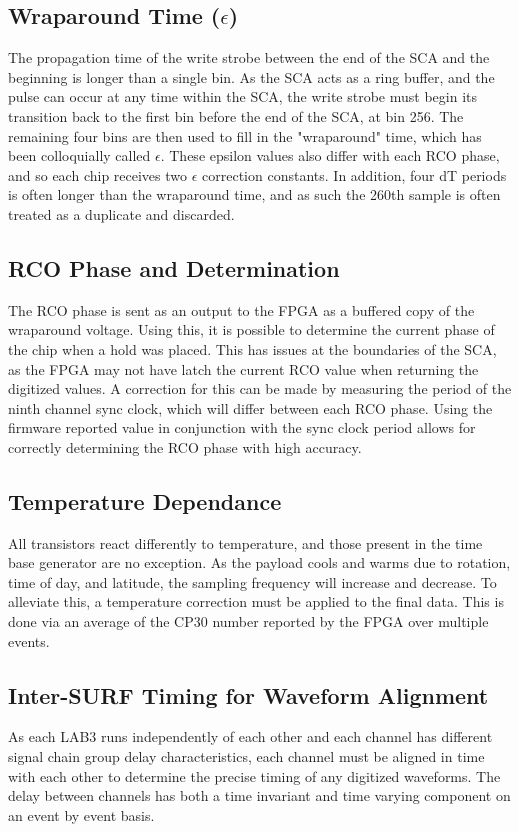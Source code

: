		
	\subsection{Wraparound Time ($\epsilon$)}
		The propagation time of the write strobe between the end of the SCA and the beginning is longer than a single bin.  As the SCA acts as a ring buffer, and the pulse can occur at any time within the SCA, the write strobe must begin its transition back to the first bin before the end of the SCA, at bin 256.  The remaining four bins are then used to fill in the "wraparound" time, which has been colloquially called $\epsilon$.  These epsilon values also differ with each RCO phase, and so each chip receives two $\epsilon$ correction constants. In addition, four dT periods is often longer than the wraparound time, and as such the 260th sample is often treated as a duplicate and discarded.  
		
	\subsection{RCO Phase and Determination}
		The RCO phase is sent as an output to the FPGA as a buffered copy of the wraparound voltage.  Using this, it is possible to determine the current phase of the chip when a hold was placed.  This has issues at the boundaries of the SCA, as the FPGA may not have latch the current RCO value when returning the digitized values.  A correction for this can be made by measuring the period of the ninth channel sync clock, which will differ between each RCO phase.  Using the firmware reported value in conjunction with the sync clock period allows for correctly determining the RCO phase with high accuracy.

	\subsection{Temperature Dependance}	
		All transistors react differently to temperature, and those present in the time base generator are no exception.  As the payload cools and warms due to rotation, time of day, and latitude, the sampling frequency will increase and decrease.  To alleviate this, a temperature correction must be applied to the final data. This is done via an average of the CP30 number reported by the FPGA over multiple events.
		

		
	\subsection{Inter-SURF Timing for Waveform Alignment}	
		As each LAB3 runs independently of each other and each channel has different signal chain group delay characteristics, each channel must be aligned in time with each other to determine the precise timing of any digitized waveforms.  The delay between channels has both a time invariant and time varying component on an event by event basis.  
		
